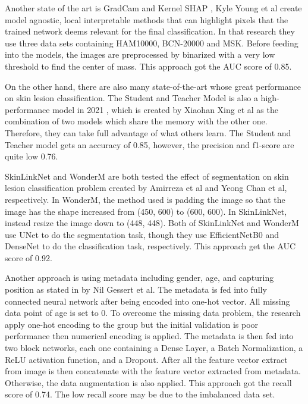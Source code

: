 \documentclass[sensors,article,submit,pdftex,moreauthors]{Definitions/mdpi}
\begin{document}
{		Another state of the art is GradCam and Kernel SHAP \mbox{\cite{06612}}, Kyle Young et al create model agnostic, local interpretable methods that can highlight pixels that the trained network deems relevant for the final classification. In that research they use three data sets containing HAM10000, BCN-20000 and MSK. Before feeding into the models, the images are preprocessed by binarized with a very low threshold to find the center of mass. This approach got the AUC score of 0.85. 
		
		On the other hand, there are also many state-of-the-art whose great performance on skin lesion classification. The Student and Teacher Model is also a high-performance model in 2021 \mbox{\cite{03225}}, which is created by Xiaohan Xing et al as the combination of two models which share the memory with the other one. Therefore, they can take full advantage of what others learn. The Student and Teacher model gets an accuracy of 0.85, however, the precision and f1-score are quite low 0.76. 
		
		SkinLinkNet \mbox{\cite{12602}} and WonderM \mbox{\cite{03426}} are both tested the effect of segmentation on skin lesion classification problem created by Amirreza et al and Yeong Chan et al, respectively. In WonderM, the method used is padding the image so that the image has the shape increased from (450, 600) to (600, 600). In SkinLinkNet, instead resize the image down to (448, 448). Both of SkinLinkNet and WonderM use UNet to do the segmentation task, though they use EfficientNetB0 and DenseNet to do the classification task, respectively. This approach get the AUC score of 0.92.
		
		Another approach is using metadata including gender, age, and capturing position as stated in \mbox{\cite{03910}} by Nil Gessert et al. The metadata is fed into fully connected neural network after being encoded into one-hot vector. All missing data point of age is set to 0. To overcome the missing data problem, the research apply one-hot encoding to the group but the initial validation is poor performance then numerical encoding is applied. The metadata is then fed into two block networks, each one containing a Dense Layer, a Batch Normalization, a ReLU activation function, and a Dropout. After all the feature vector extract from image is then concatenate with the feature vector extracted from metadata. Otherwise, the data augmentation is also applied. This approach got the recall score of 0.74. The low recall score may be due to the imbalanced data set.
		
}
\end{document}
